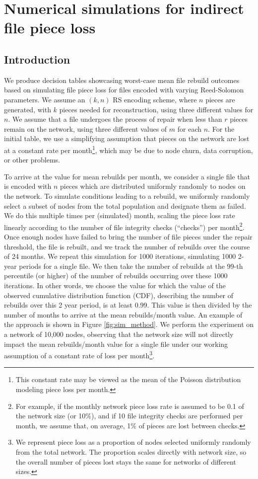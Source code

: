 
\section{Numerical simulations for indirect file piece loss}
\subsection{Introduction}
We produce decision tables showcasing worst-case mean file rebuild outcomes based on simulating file piece loss for files encoded with varying Reed-Solomon parameters.
We assume an $(k,n)$ RS encoding scheme, where $n$ pieces are generated, with
$k$ pieces needed for reconstruction, using three different values for $n$.
We assume that a file undergoes the process of repair when less than $r$ pieces remain on the network, using three different values of $m$ for each $n$.
For the initial table, we use a simplifying assumption that pieces on the network are lost at a constant rate per month\footnote{This constant rate may be viewed as the mean of the Poisson distribution modeling piece loss per month.}, which may be due to node churn, data corruption, or other problems.


To arrive at the value for mean rebuilds per month, we consider a single file that is encoded with $n$ pieces which are distributed uniformly randomly to nodes on the network. To simulate conditions leading to a rebuild, we uniformly randomly select a subset of nodes from the total population and designate them as failed. We do this multiple times per (simulated) month, scaling the piece loss rate linearly according to the number of file integrity checks (``checks'') per month\footnote{
For example, if the monthly network piece loss rate is assumed to be 0.1 of the network size (or 10\%), and if 10 file integrity checks are performed per month, we assume that, on average, 1\% of pieces are lost between checks.}.
Once enough nodes have failed to bring the number of file pieces under the repair threshold, the file is rebuilt, and we track the number of rebuilds over the course of 24 months.
We repeat this simulation for 1000 iterations, simulating 1000 2-year periods for a single file. We then take the number of rebuilds at the 99-th percentile (or higher) of the number of rebuilds occurring over these 1000 iterations. In other words, we choose the value for which the value of the observed cumulative distribution function (CDF), describing the number of rebuilds over this 2 year period, is at least 0.99. This value is then divided by the number of months to arrive at the mean rebuilds/month value. An example of the approach is shown in Figure \ref{fig:sim_method}. We perform the experiment on a network of 10,000 nodes, observing that the network size will not directly impact the mean rebuilds/month value for a single file under our working assumption of a constant rate of loss per month\footnote{We represent piece loss as a proportion of nodes selected uniformly randomly from the total network. The proportion scales directly with network size, so the overall number of pieces lost stays the same for networks of different sizes.}.

